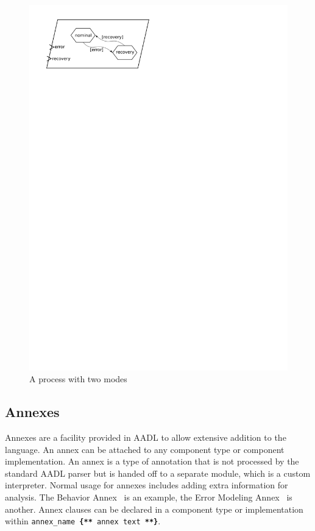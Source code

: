 \begin{figure}
\centering
\includegraphics[scale=0.75]{figs/modes}
\caption{A process with two modes}
\label{fig:modes}
\end{figure}

\subsection{Annexes}
Annexes are a facility provided in AADL to allow extensive addition to
the language. An annex can be attached to any component type or
component implementation. An annex is a type of annotation that is not
processed by the standard AADL parser but is handed off to a separate
module, which is a custom interpreter. Normal usage for annexes
includes adding extra information for analysis. The Behavior
Annex~\cite{filali@iceccs07} is an example, the Error Modeling
Annex~\cite{aadlerrormodel, ana@corr07} is another. Annex clauses can
be declared in a component type or implementation within \texttt{annex\_name \textbf{\{**} annex text \textbf{**\}}}.

